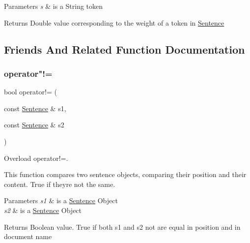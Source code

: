 \begin{DoxyParams}{Parameters}
{\em s} & is a String token \\
\hline
\end{DoxyParams}
\begin{DoxyReturn}{Returns}
Double value corresponding to the weight of a token in \hyperlink{class_sentence}{Sentence} 
\end{DoxyReturn}


\subsection{Friends And Related Function Documentation}
\mbox{\label{class_sentence_a84044f682118271ebe2616b422351d9a}} 
\subsubsection{\texorpdfstring{operator"!=}{operator!=}}
{\footnotesize\ttfamily bool operator!= (\begin{DoxyParamCaption}\item[{const \hyperlink{class_sentence}{Sentence} \&}]{s1,  }\item[{const \hyperlink{class_sentence}{Sentence} \&}]{s2 }\end{DoxyParamCaption})\hspace{0.3cm}{\ttfamily [friend]}}



Overload operator!=. 

This function compares two sentence objects, comparing their position and their content. True if they\textquotesingle{}re not the same.


\begin{DoxyParams}{Parameters}
{\em s1} & is a \hyperlink{class_sentence}{Sentence} Object \\
\hline
{\em s2} & is a \hyperlink{class_sentence}{Sentence} Object \\
\hline
\end{DoxyParams}
\begin{DoxyReturn}{Returns}
Boolean value. True if both s1 and s2 not are equal in position and in document name 
\end{DoxyReturn}
\mbox{\label{class_sentence_ad954a285e5a614d6c239835d0b18aabf}} 

